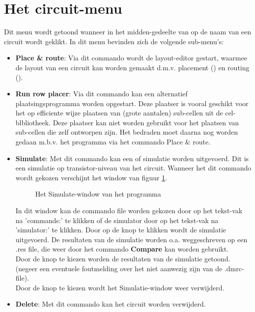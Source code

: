 \section{Het circuit-menu}
Dit menu wordt getoond wanneer in het midden-gedeelte van 
op de naam van een circuit wordt geklikt.
In dit menu bevinden zich de volgende sub-menu's:
\begin{itemize}
\item {\bf Place \& route}:
Via dit commando wordt de layout-editor  gestart, waarmee de layout
van een circuit kan worden gemaakt d.m.v. placement () en routing ().
\item {\bf Run row placer}:
Via dit commando kan een alternatief plaatsingsprogramma worden opgestart.
Deze plaatser is vooral geschikt voor het op efficiente wijze plaatsen van 
(grote aantalen) sub-cellen uit de cel-blbliotheek.
Deze plaatser kan niet worden gebruikt voor het plaatsen van sub-cellen
die zelf ontworpen zijn.
Het bedraden moet daarna nog worden gedaan m.b.v. het programma 
via het commando Place \& route.
\item {\bf Simulate}:
Met dit commando kan een  of  simulatie worden uitgevoerd.
Dit is een simu\-latie op transistor-niveau van het circuit.
Wanneer het dit commando wordt gekozen verschijnt het window van
figuur \ref{sim-sls-window}.
\begin{figure}[htb]
\centerline{}
\caption{Het Simulate-window van het programma }
\label{sim-sls-window}
\end{figure}
In dit window kan de commando file worden gekozen door op het tekst-vak
na 'commands:' te klikken of de simulator door op het tekst-vak na 'simulator:'
te klikken.
Door op de  knop te klikken wordt de simulatie uitgevoerd.
De resultaten van de simulatie worden o.a. weggeschreven op een .res file,
die weer door het commando {\bf Compare} kan worden gebruikt.\\
Door de knop  te kiezen worden de resultaten van de
simulatie getoond. (negeer een eventuele foutmelding over het niet aanwezig zijn
van de .dmrc-file).\\
Door de  knop te kiezen wordt het Simulatie-window weer verwijderd.
\item {\bf Delete}:
Met dit commando kan het circuit worden verwijderd.
\end{itemize}

